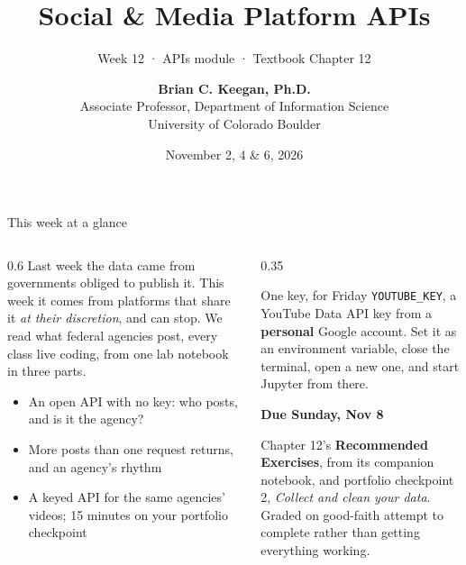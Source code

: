 \documentclass[9pt,aspectratio=169]{beamer}
\title[Week 12 · Social APIs]{{\Huge Social \& Media Platform APIs}}
\subtitle{Week 12 · APIs module · Textbook Chapter 12}
\author[Keegan]{\textbf{Brian C. Keegan, Ph.D.} \\ Associate Professor, Department of Information Science \\ University of Colorado Boulder}
\date{November 2, 4 \& 6, 2026}
\begin{document}
\maketitle

\begin{frame}{This week at a glance}
    \begin{columns}[T]
        \begin{column}{0.6\textwidth}
            Last week the data came from governments obliged to publish it. This week it comes from platforms that share it \textit{at their discretion}, and can stop. We read what federal agencies post, every class live coding, from one lab notebook in three parts.

            \bigskip

            \begin{itemize}\small
                \item An open API with no key: who posts, and is it the agency?
            \end{itemize}

            \medskip

            \begin{itemize}\small
                \item More posts than one request returns, and an agency's rhythm
            \end{itemize}

            \medskip

            \begin{itemize}\small
                \item A keyed API for the same agencies' videos; 15 minutes on your portfolio checkpoint
            \end{itemize}
        \end{column}
        \begin{column}{0.35\textwidth}
            \begin{alertblock}{One key, for Friday}
                \footnotesize \texttt{YOUTUBE\_KEY}, a YouTube Data API key from a \textbf{personal} Google account. Set it as an environment variable, close the terminal, open a new one, and start Jupyter from there.
            \end{alertblock}
            \textbf{Due Sunday, Nov 8}\\[2pt]
            {\footnotesize Chapter 12's \textbf{Recommended Exercises}, from its companion notebook, and portfolio checkpoint 2, \textit{Collect and clean your data}. Graded on good-faith attempt to complete rather than getting everything working.\par}
            \medskip
        \end{column}
    \end{columns}
\end{frame}
\end{document}
